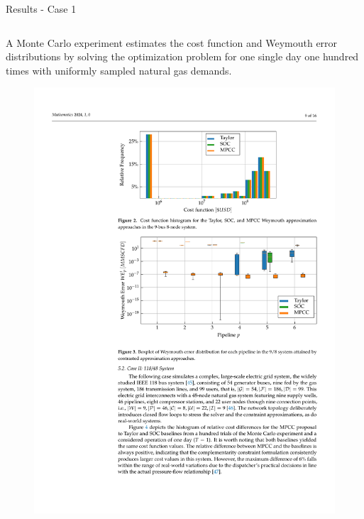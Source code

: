 \documentclass[hyperref={colorlinks,citecolor=blue,linkcolor=blue,urlcolor=blue}]{beamer}
\newlength\figureheight
\newlength\figurewidth
\begin{document}
\begin{frame}{Results - Case 1}
\scriptsize
\begin{columns}[t,onlytextwidth]
    \begin{column}{0.48\textwidth}
        A Monte Carlo experiment estimates the cost function and Weymouth error distributions by solving the optimization problem for one single day one hundred times with uniformly sampled natural gas demands.
        
        \vspace{0.5em}
        \begin{figure}[H]
            \centering
            \setlength{}        
            \setlength{}
            \includegraphics[width=\figurewidth, height=\figureheight]{figures/case1_cost.pdf} %
            \label{fig:blue_test_cost}
        \end{figure}
    \end{column}
    

\end{columns}
\end{frame}
\end{document}
